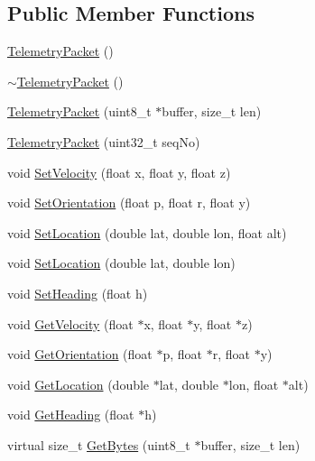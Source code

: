 \subsection*{Public Member Functions}
\begin{DoxyCompactItemize}
\item 
\hyperlink{class_protocol_1_1_telemetry_packet_a71b0df1730ed60301fe1ff0b22a0dc09}{Telemetry\+Packet} ()
\item 
\hyperlink{class_protocol_1_1_telemetry_packet_ad1ff3ae0a25afc4df6c5d7b3bff0efbd}{$\sim$\+Telemetry\+Packet} ()
\item 
\hyperlink{class_protocol_1_1_telemetry_packet_a6f4b307892126a00e82278fd183d946c}{Telemetry\+Packet} (uint8\+\_\+t $\ast$buffer, size\+\_\+t len)
\item 
\hyperlink{class_protocol_1_1_telemetry_packet_afdd8e67e4fa68af9ae21257f17946152}{Telemetry\+Packet} (uint32\+\_\+t seq\+No)
\item 
void \hyperlink{class_protocol_1_1_telemetry_packet_a884b1f0fe09c50f4e1bb2034d3dc3b27}{Set\+Velocity} (float x, float y, float z)
\item 
void \hyperlink{class_protocol_1_1_telemetry_packet_a74ed46006349eba2a2dad08421d66f6e}{Set\+Orientation} (float p, float r, float y)
\item 
void \hyperlink{class_protocol_1_1_telemetry_packet_ab977283fdafb89bebca3a0886c2a3ee9}{Set\+Location} (double lat, double lon, float alt)
\item 
void \hyperlink{class_protocol_1_1_telemetry_packet_a33769f679172881acb1ee6004240fc79}{Set\+Location} (double lat, double lon)
\item 
void \hyperlink{class_protocol_1_1_telemetry_packet_a9ab33ab74a354c23787b62354fd2c365}{Set\+Heading} (float h)
\item 
void \hyperlink{class_protocol_1_1_telemetry_packet_a5e67607eff1a34ee2747e232c806b8c1}{Get\+Velocity} (float $\ast$x, float $\ast$y, float $\ast$z)
\item 
void \hyperlink{class_protocol_1_1_telemetry_packet_ac2cbd3c31a0d9b184a6d8fc79a77a80b}{Get\+Orientation} (float $\ast$p, float $\ast$r, float $\ast$y)
\item 
void \hyperlink{class_protocol_1_1_telemetry_packet_a1b4a35e86bac0731ab8176cb9371c2a8}{Get\+Location} (double $\ast$lat, double $\ast$lon, float $\ast$alt)
\item 
void \hyperlink{class_protocol_1_1_telemetry_packet_a99157743e501e0ad781a7aa55ed9efad}{Get\+Heading} (float $\ast$h)
\item 
virtual size\+\_\+t \hyperlink{class_protocol_1_1_telemetry_packet_a36d86bf7afc3dcdd820ffa0982c5177a}{Get\+Bytes} (uint8\+\_\+t $\ast$buffer, size\+\_\+t len)
\end{DoxyCompactItemize}
